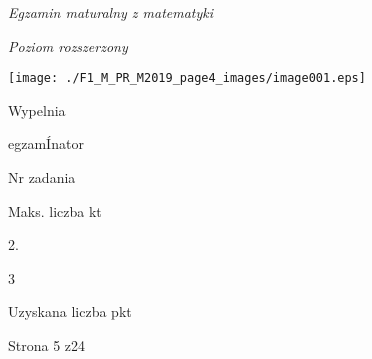 \documentclass[a4paper,12pt]{article}
\begin{document}
{\it Egzamin maturalny z matematyki}

{\it Poziom rozszerzony}
\begin{center}
\texttt{[image: ./F1\_M\_PR\_M2019\_page4\_images/image001.eps]}
\end{center}
Wypelnia

egzamÍnator

Nr zadania

Maks. liczba kt

2.

3

Uzyskana liczba pkt

Strona 5 z24
\end{document}
